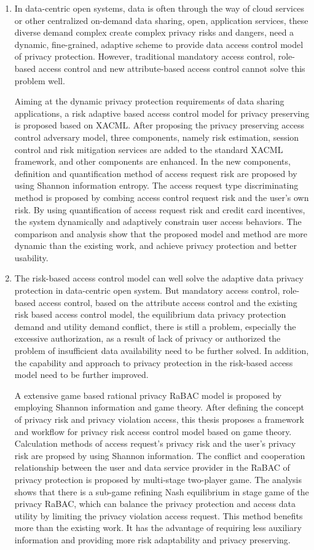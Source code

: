 \documentclass[pdftex,notypeinfo,twoside,openany,UTF8,fntef]{CASthesis}
\theoremstyle{THrm}{
	\newtheorem{question}{Question}[section]
	\newtheorem{property}{性质}[section]
	\newtheorem{assumption}{假设}[section]
	\newtheorem{claim}[lemma]{断言}
	
}
\begin{document}
\begin{enumerate}
	\item
	In data-centric open systems, data is often through the way of cloud services or other centralized on-demand data sharing, open, application services, these diverse demand complex create complex privacy risks and dangers, need a dynamic, fine-grained, adaptive scheme to provide data access control model of privacy protection. However, traditional mandatory access control, role-based access control and new attribute-based access control cannot solve this problem well.
		
	Aiming at the dynamic privacy protection requirements of data sharing applications, a risk adaptive based access control model for privacy preserving is proposed based on XACML. After proposing the privacy preserving access control adversary model, three components, namely risk estimation, session control and risk mitigation services are added to the standard XACML framework, and other components are enhanced. In the new components, definition and quantification method of access request risk are proposed by using Shannon information entropy.  The access request type discriminating method is proposed by combing access control request risk  and the user's own risk. By using quantification of access request risk and  credit card incentives, the system dynamically and adaptively constrain user access behaviors. The comparison and analysis show that the proposed model and method are more dynamic than the existing work, and achieve privacy protection and better usability.
	
	\item 	
	The risk-based access control model can well solve the adaptive data privacy protection in data-centric open system. But mandatory access control, role-based access control, based on the attribute access control and the existing risk based access control model, the equilibrium data privacy protection demand and utility demand conflict, there is still a problem, especially the excessive authorization, as a result of lack of privacy or authorized the problem of insufficient data availability need to be further solved. In addition, the capability and approach to privacy protection in the risk-based access model need to be further improved.
		
	A extensive game based rational privacy RaBAC model is proposed by employing Shannon information and game theory. After defining the concept of privacy risk and privacy violation access, this thesis proposes a framework and workflow for privacy risk access control model based on game theory. Calculation methods of access request's privacy risk and  the user's privacy risk are propsed by using Shannon information.
	The conflict and cooperation relationship between the user and data service provider in the RaBAC of privacy protection is proposed by multi-stage two-player game. The analysis shows that there is a sub-game refining Nash equilibrium in stage game of the privacy RaBAC, which can balance the privacy protection and access data utility by limiting the privacy violation access request. This method benefits more than the existing work. It has the advantage of requiring less auxiliary information and providing more risk adaptability and privacy preserving.
	

\end{enumerate}
\end{document}
